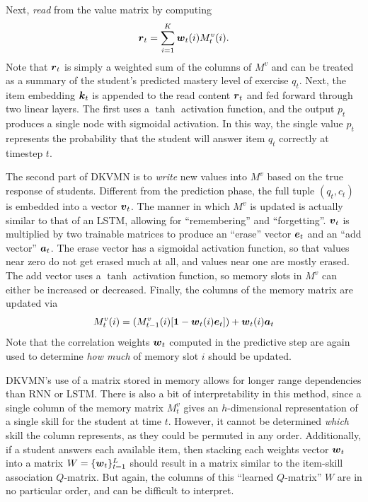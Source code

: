 Next, \textit{read} from the value matrix by computing 
\begin{equation}
  \boldsymbol{r}_t = \sum_{i=1}^K \boldsymbol{w}_t(i) M_t^v(i).
  \label{eq:dkvmn_read}
\end{equation}
Note that $\boldsymbol{r}_t$ is simply a weighted sum of the columns of $M^v$ and can be treated as a summary of the student's predicted mastery level of exercise $q_t$. Next, the item embedding $\boldsymbol{k}_t$ is appended to the read content $\boldsymbol{r}_t$ and fed forward through two linear layers. The first uses a $\tanh$ activation function, and the output $p_t$ produces a single node with sigmoidal activation. In this way, the single value $p_t$ represents the probability that the student will answer item $q_t$ correctly at timestep $t$.

The second part of DKVMN is to \textit{write} new values into $M^v$ based on the true response of students. Different from the prediction phase, the full tuple $(q_t,c_t)$ is embedded into a vector $\boldsymbol{v}_t$. The manner in which $M^v$ is updated is actually similar to that of an LSTM, allowing for ``remembering'' and ``forgetting''. $\boldsymbol{v}_t$ is multiplied by two trainable matrices to produce an ``erase'' vector $\boldsymbol{e}_t$ and an ``add vector'' $\boldsymbol{a}_t$. The erase vector has a sigmoidal activation function, so that values near zero do not get erased much at all, and values near one are mostly erased. The add vector uses a $\tanh$ activation function, so memory slots in $M^v$ can either be increased or decreased. Finally, the columns of the memory matrix are updated via
\begin{equation}
  M_{t}^v(i) = (M_{t-1}^v(i) [\boldsymbol{1} - \boldsymbol{w}_t(i) \boldsymbol{e}_t] ) + \boldsymbol{w}_t(i) \boldsymbol{a}_t
  \label{eq:update_dkvmn}
\end{equation}
Note that the correlation weights $\boldsymbol{w}_t$ computed in the predictive step are again used to determine \textit{how much} of memory slot $i$ should be updated.

DKVMN's use of a matrix stored in memory allows for longer range dependencies than RNN or LSTM. There is also a bit of interpretability in this method, since a single column of the memory matrix $M_t^v$ gives an $h$-dimensional representation of a single skill for the student at time $t$. However, it cannot be determined \textit{which} skill the column represents, as they could be permuted in any order. Additionally, if a student answers each available item, then stacking each weights vector $\boldsymbol{w}_t$ into a matrix $W = \{\boldsymbol{w}_t\}_{t=1}^L$ should result in a matrix similar to the item-skill association $Q$-matrix. But again, the columns of this ``learned $Q$-matrix'' $W$ are in no particular order, and can be difficult to interpret.


